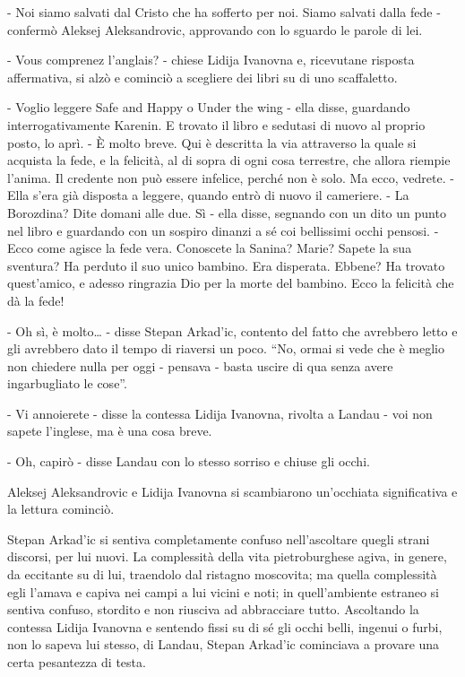- Noi siamo salvati dal Cristo che ha sofferto per noi. Siamo salvati dalla fede - confermò Aleksej Aleksandrovic, approvando con lo sguardo le parole di lei. 

- Vous comprenez l'anglais? - chiese Lidija Ivanovna e, ricevutane risposta affermativa, si alzò e cominciò a scegliere dei libri su di uno scaffaletto. 

- Voglio leggere Safe and Happy o Under the wing - ella disse, guardando interrogativamente Karenin. E trovato il libro e sedutasi di nuovo al proprio posto, lo aprì. - È molto breve. Qui è descritta la via attraverso la quale si acquista la fede, e la felicità, al di sopra di ogni cosa terrestre, che allora riempie l'anima. Il credente non può essere infelice, perché non è solo. Ma ecco, vedrete. - Ella s'era già disposta a leggere, quando entrò di nuovo il cameriere. - La Borozdina? Dite domani alle due. Sì - ella disse, segnando con un dito un punto nel libro e guardando con un sospiro dinanzi a sé coi bellissimi occhi pensosi. - Ecco come agisce la fede vera. Conoscete la Sanina? Marie? Sapete la sua sventura? Ha perduto il suo unico bambino. Era disperata. Ebbene? Ha trovato quest'amico, e adesso ringrazia Dio per la morte del bambino. Ecco la felicità che dà la fede! 

- Oh sì, è molto\ldots{} - disse Stepan Arkad'ic, contento del fatto che avrebbero letto e gli avrebbero dato il tempo di riaversi un poco. ``No, ormai si vede che è meglio non chiedere nulla per oggi - pensava - basta uscire di qua senza avere ingarbugliato le cose''. 

- Vi annoierete - disse la contessa Lidija Ivanovna, rivolta a Landau - voi non sapete l'inglese, ma è una cosa breve. 

- Oh, capirò - disse Landau con lo stesso sorriso e chiuse gli occhi. 

Aleksej Aleksandrovic e Lidija Ivanovna si scambiarono un'occhiata significativa e la lettura cominciò. 

\label{xxii-6} 

Stepan Arkad'ic si sentiva completamente confuso nell'ascoltare quegli strani discorsi, per lui nuovi. La complessità della vita pietroburghese agiva, in genere, da eccitante su di lui, traendolo dal ristagno moscovita; ma quella complessità egli l'amava e capiva nei campi a lui vicini e noti; in quell'ambiente estraneo si sentiva confuso, stordito e non riusciva ad abbracciare tutto. Ascoltando la contessa Lidija Ivanovna e sentendo fissi su di sé gli occhi belli, ingenui o furbi, non lo sapeva lui stesso, di Landau, Stepan Arkad'ic cominciava a provare una certa pesantezza di testa. 

